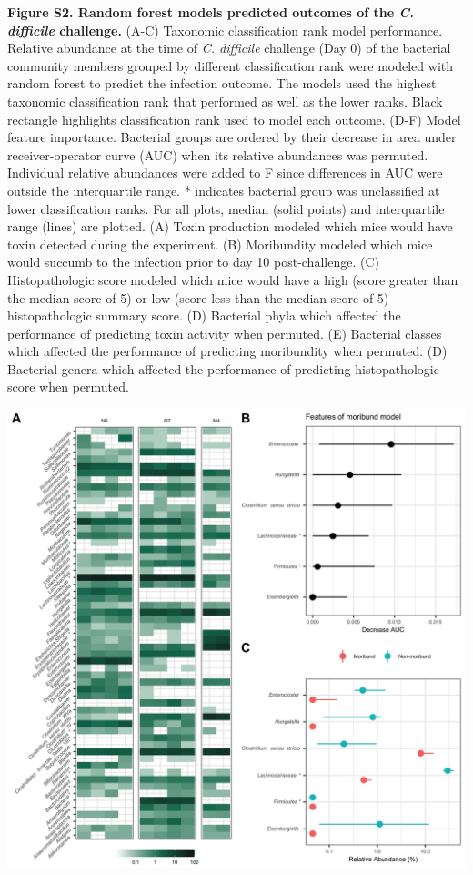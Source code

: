 \documentclass[
  12pt,
]{article}
\begin{document}
\textbf{Figure S2. Random forest models predicted outcomes of the
\emph{C. difficile} challenge.} (A-C) Taxonomic classification rank
model performance. Relative abundance at the time of \emph{C. difficile}
challenge (Day 0) of the bacterial community members grouped by
different classification rank were modeled with random forest to predict
the infection outcome. The models used the highest taxonomic
classification rank that performed as well as the lower ranks. Black
rectangle highlights classification rank used to model each outcome.
(D-F) Model feature importance. Bacterial groups are ordered by their
decrease in area under receiver-operator curve (AUC) when its relative
abundances was permuted. Individual relative abundances were added to F
since differences in AUC were outside the interquartile range. *
indicates bacterial group was unclassified at lower classification
ranks. For all plots, median (solid points) and interquartile range
(lines) are plotted. (A) Toxin production modeled which mice would have
toxin detected during the experiment. (B) Moribundity modeled which mice
would succumb to the infection prior to day 10 post-challenge. (C)
Histopathologic score modeled which mice would have a high (score
greater than the median score of 5) or low (score less than the median
score of 5) histopathologic summary score. (D) Bacterial phyla which
affected the performance of predicting toxin activity when permuted. (E)
Bacterial classes which affected the performance of predicting
moribundity when permuted. (D) Bacterial genera which affected the
performance of predicting histopathologic score when permuted.

\hfill\break

\includegraphics{../results/figures/figure_S3.jpg}
\end{document}
